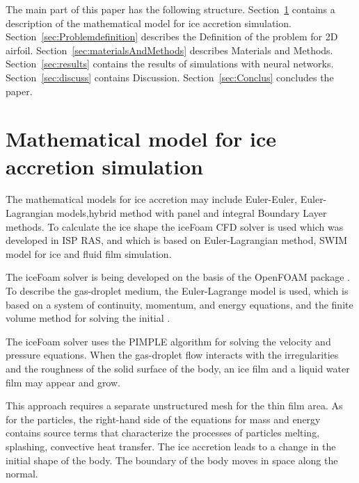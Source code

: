 \documentclass[aerospace,article,submit,moreauthors,pdftex]{Definitions/mdpi}
\begin{document}
The main part of this paper has the following structure. Section~\ref{sec:mathematical-model} contains a description of the mathematical model for ice accretion simulation. Section~\ref{sec:Problemdefinition} describes the Definition of the problem for 2D airfoil. Section~\ref{sec:materialsAndMethods} describes Materials and Methods. Section~\ref{sec:results} contains the results of simulations with neural networks. Section~\ref{sec:discuss} contains Discussion. Section~\ref{sec:Conclus} concludes the paper.


\section{Mathematical model for ice accretion simulation}\label{sec:mathematical-model}

The mathematical models for ice accretion may include Euler-Euler, Euler-Lagrangian models,hybrid method with panel and integral Boundary Layer methods. To calculate the ice shape the iceFoam CFD solver is used which was developed in ISP RAS, and which is based on Euler-Lagrangian method, SWIM model for ice and fluid film simulation. \cite{KoshelevMelnikovaStrijhak2020}

The iceFoam solver is being developed on the basis of the OpenFOAM package \cite{OpenFoam}. To describe the gas-droplet medium, the Euler-Lagrange model is used, which is based on a system of continuity, momentum, and energy equations, and the finite volume method for solving the initial  \cite{WellerTaborJasakFureby1998}. 

The iceFoam solver uses the PIMPLE algorithm for solving the velocity and pressure equations. When the gas-droplet flow interacts with the irregularities and the roughness of the solid surface of the body, an ice film and a liquid water film may appear and grow. 

This approach requires a separate unstructured mesh for the thin film area. As for the particles, the right-hand side of the equations for mass and energy contains source terms that characterize the processes of particles melting, splashing, convective heat transfer. The ice accretion leads to a change in the initial shape of the body. The boundary of the body moves in space along the normal. 
\end{document}
